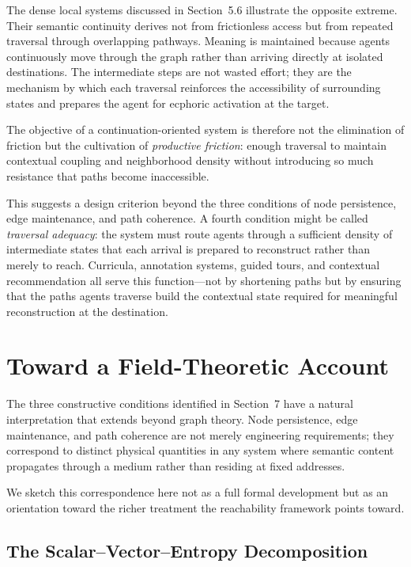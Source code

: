 \documentclass[12pt]{article}
\begin{document}
The dense local systems discussed in Section~5.6 illustrate the opposite
extreme.
Their semantic continuity derives not from frictionless access but from
repeated traversal through overlapping pathways.
Meaning is maintained because agents continuously move through the graph
rather than arriving directly at isolated destinations.
The intermediate steps are not wasted effort; they are the mechanism by
which each traversal reinforces the accessibility of surrounding states
and prepares the agent for ecphoric activation at the target.

The objective of a continuation-oriented system is therefore not the
elimination of friction but the cultivation of \emph{productive friction}:
enough traversal to maintain contextual coupling and neighborhood density
without introducing so much resistance that paths become inaccessible.

This suggests a design criterion beyond the three conditions of
node persistence, edge maintenance, and path coherence.
A fourth condition might be called \emph{traversal adequacy}: the system
must route agents through a sufficient density of intermediate states
that each arrival is prepared to reconstruct rather than merely to
reach.
Curricula, annotation systems, guided tours, and contextual recommendation
all serve this function---not by shortening paths but by ensuring that
the paths agents traverse build the contextual state required for
meaningful reconstruction at the destination.

\section{Toward a Field-Theoretic Account}

The three constructive conditions identified in Section~7 have a natural
interpretation that extends beyond graph theory.
Node persistence, edge maintenance, and path coherence are not merely
engineering requirements; they correspond to distinct physical quantities
in any system where semantic content propagates through a medium rather
than residing at fixed addresses.

We sketch this correspondence here not as a full formal development but
as an orientation toward the richer treatment the reachability framework
points toward.

\subsection{The Scalar--Vector--Entropy Decomposition}
\end{document}
